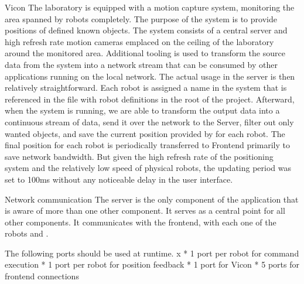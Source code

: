 \secc Vicon
The laboratory is equipped with a {\vicon} motion capture system, monitoring the area spanned by robots completely. The purpose of the system is to provide positions of defined known objects.\br
The system consists of a central server and high refresh rate motion cameras emplaced on the ceiling of the laboratory around the monitored area. Additional tooling is used to transform the source data from the {\vicon} system into a network stream that can be consumed by other applications running on the local network.\br
The actual usage in the server is then relatively straightforward. Each robot is assigned a name in the {\vicon} system that is referenced in the file with robot definitions in the root of the project. Afterward, when the {\vicon} system is running, we are able to transform the output data into a continuous stream of data, send it over the network to the Server, filter out only wanted objects, and save the current position provided by {\vicon} for each robot. The final position for each robot is periodically transferred to Frontend primarily to save network bandwidth. But given the high refresh rate of the positioning system and the relatively low speed of physical robots, the updating period was set to 100ms without any noticeable delay in the user interface.

\secc Network communication
The server is the only component of the application that is aware of more than one other component. It serves as a central point for all other components. It communicates with the frontend, with each one of the robots and {\vicon}.

The following ports should be used at runtime.
\begitems \style x
    * 1 port per robot for command execution
    * 1 port per robot for position feedback
    * 1 port for Vicon
    * 5 ports for frontend connections
\enditems

